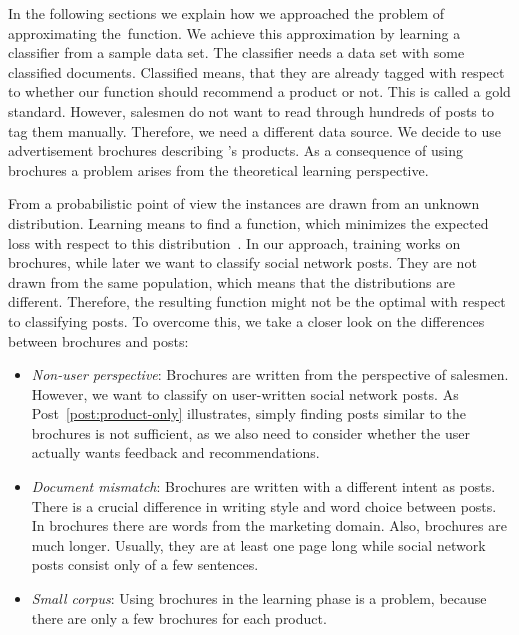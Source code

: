 In the following sections we explain how we approached the problem of approximating the~\nto function.
We achieve this approximation by learning a classifier from a sample data set.
The classifier needs a data set with some classified documents.
Classified means, that they are already tagged with respect to whether our \nto function should recommend a product or not.
This is called a gold standard.
However, salesmen do not want to read through hundreds of posts to tag them manually.
Therefore, we need a different data source.
We decide to use advertisement brochures describing \acme's products.
As a consequence of using brochures a problem arises from the theoretical learning perspective.

From a probabilistic point of view the instances are drawn from an unknown distribution.
Learning means to find a function, which minimizes the expected loss with respect to this distribution~\cite{trafalis2000support}.
In our approach, training works on brochures, while later we want to classify social network posts.
They are not drawn from the same population, which means that the distributions are different.
Therefore, the resulting function might not be the optimal with respect to classifying posts.
To overcome this, we take a closer look on the differences between brochures and posts:

 \begin{itemize}
 	\item
		\emph{Non-user perspective}:
		Brochures are written from the perspective of salesmen.
		However, we want to classify on user-written social network posts.
		As Post~\ref{post:product-only} illustrates, simply finding posts similar to the brochures is not sufficient, as we also need to consider whether the user actually wants feedback and recommendations.
	\item
		\emph{Document mismatch}:
		Brochures are written with a different intent as posts.
		There is a crucial difference in writing style and word choice between posts.
		In brochures there are words from the marketing domain.
		Also, brochures are much longer.
		Usually, they are at least one page long while social network posts consist only of a few sentences.
	\item
		\emph{Small corpus}:
		Using brochures in the learning phase is a problem, because there are only a few brochures for each product.
 \end{itemize}
